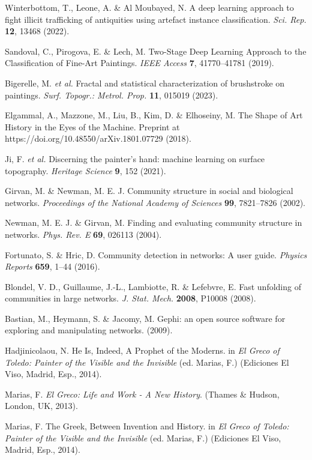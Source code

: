\documentclass[11pt]{article}
\begin{document}
\begin{thebibliography}{42}
Winterbottom, T., Leone, A. \& Al Moubayed, N. A deep learning
approach to fight illicit trafficking of antiquities using artefact
instance classification. \emph{Sci. Rep.} \textbf{12}, 13468 (2022).

Sandoval, C., Pirogova, E. \& Lech, M. Two-Stage Deep Learning
Approach to the Classification of Fine-Art Paintings. \emph{IEEE Access}
\textbf{7}, 41770--41781 (2019).

Bigerelle, M. \emph{et al.} Fractal and statistical characterization
of brushstroke on paintings. \emph{Surf. Topogr.: Metrol. Prop.}
\textbf{11}, 015019 (2023).

Elgammal, A., Mazzone, M., Liu, B., Kim, D. \& Elhoseiny, M. The
Shape of Art History in the Eyes of the Machine. Preprint at
https://doi.org/10.48550/arXiv.1801.07729 (2018).

Ji, F. \emph{et al.} Discerning the painter's hand: machine learning
on surface topography. \emph{Heritage Science} \textbf{9}, 152 (2021).

Girvan, M. \& Newman, M. E. J. Community structure in social and
biological networks. \emph{Proceedings of the National Academy of
Sciences} \textbf{99}, 7821--7826 (2002).

Newman, M. E. J. \& Girvan, M. Finding and evaluating community
structure in networks. \emph{Phys. Rev. E} \textbf{69}, 026113 (2004).

Fortunato, S. \& Hric, D. Community detection in networks: A user
guide. \emph{Physics Reports} \textbf{659}, 1--44 (2016).

Blondel, V. D., Guillaume, J.-L., Lambiotte, R. \& Lefebvre, E. Fast
unfolding of communities in large networks. \emph{J. Stat. Mech.}
\textbf{2008}, P10008 (2008).

Bastian, M., Heymann, S. \& Jacomy, M. Gephi: an open source
software for exploring and manipulating networks. (2009).

Hadjinicolaou, N. He Is, Indeed, A Prophet of the Moderns. in
\emph{El Greco of Toledo: Painter of the Visible and the Invisible} (ed.
Marias, F.) (Ediciones El Viso, Madrid, Esp., 2014).

Marias, F. \emph{El Greco: Life and Work - A New History}. (Thames
\& Hudson, London, UK, 2013).

Marias, F. The Greek, Between Invention and History. in \emph{El
Greco of Toledo: Painter of the Visible and the Invisible} (ed. Marias,
F.) (Ediciones El Viso, Madrid, Esp., 2014).


\end{thebibliography}
\end{document}
